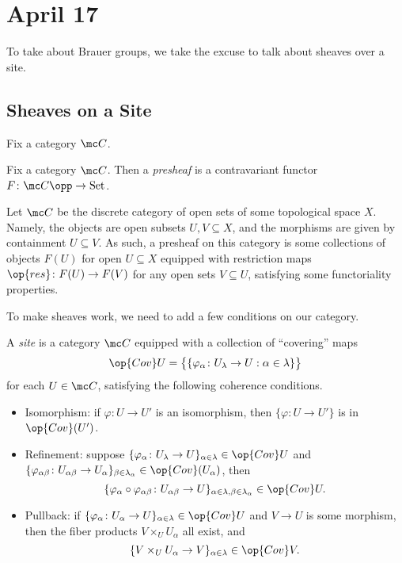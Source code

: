 \documentclass[../notes.tex]{subfiles}
\begin{document}
\section{April 17}

To take about Brauer groups, we take the excuse to talk about sheaves over a site.

\subsection{Sheaves on a Site}
Fix a category $\mc C$.
\begin{definition}[presheaf]
	Fix a category $\mc C$. Then a \textit{presheaf} is a contravariant functor $F\colon\mc C\opp\to\mathrm{Set}$.
\end{definition}
\begin{example}
	Let $\mc C$ be the discrete category of open sets of some topological space $X$. Namely, the objects are open subsets $U,V\subseteq X$, and the morphisms are given by containment $U\subseteq V$. As such, a presheaf on this category is some collections of objects $F(U)$ for open $U\subseteq X$ equipped with restriction maps $\op{res}\colon F(U)\to F(V)$ for any open sets $V\subseteq U$, satisfying some functoriality properties.
\end{example}
To make sheaves work, we need to add a few conditions on our category.
\begin{definition}[site]
	A \textit{site} is a category $\mc C$ equipped with a collection of ``covering'' maps
	\[\op{Cov}U=\big\{\{\varphi_\alpha\colon U_\lambda\to U:\alpha\in\lambda\}\big\}\]
	for each $U\in\mc C$, satisfying the following coherence conditions.
	\begin{itemize}
		\item Isomorphism: if $\varphi\colon U\to U'$ is an isomorphism, then $\{\varphi\colon U\to U'\}$ is in $\op{Cov}(U')$.
		\item Refinement: suppose $\{\varphi_\alpha\colon U_\lambda\to U\}_{\alpha\in\lambda}\in\op{Cov}U$ and $\{\varphi_{\alpha\beta}\colon U_{\alpha\beta}\to U_\alpha\}_{\beta\in\lambda_\alpha}\in\op{Cov}(U_\alpha)$, then
		\[\{\varphi_\alpha\circ\varphi_{\alpha\beta}\colon U_{\alpha\beta}\to U\}_{\alpha\in\lambda,\beta\in\lambda_\alpha}\in\op{Cov}U.\]
		\item Pullback: if $\{\varphi_\alpha\colon U_\alpha\to U\}_{\alpha\in\lambda}\in\op{Cov}U$ and $V\to U$ is some morphism, then the fiber products $V\times_UU_\alpha$ all exist, and
		\[\{V\times_UU_\alpha\to V\}_{\alpha\in\lambda}\in\op{Cov}V.\]
	\end{itemize}
\end{definition}
\end{document}
